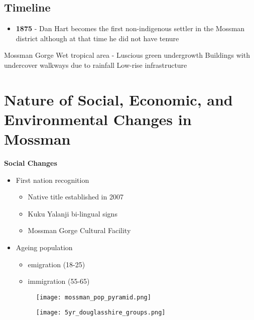 	\subsection{Timeline}
	
		\begin{itemize}
			\item \textbf{1875} - Dan Hart becomes the first non-indigenous settler in the Mossman district although at that time he did not have tenure
		\end{itemize}


	Mossman Gorge
	Wet tropical area - Luscious green undergrowth
	Buildings with undercover walkways due to rainfall
	Low-rise infrastructure


\section{Nature of Social, Economic, and Environmental Changes in Mossman} \label{18/03/2025}

	\textbf{Social Changes}

		\begin{itemize}
			\item First nation recognition
				\begin{itemize}
					\item Native title established in 2007
					\item Kuku Yalanji bi-lingual signs
					\item Mossman Gorge Cultural Facility
				\end{itemize}
			\item Ageing population
				\begin{itemize}
					\item emigration (18-25)
					\item immigration (55-65)
				\end{itemize}

			\begin{figure}[H]
				\centering
				\texttt{[image: mossman\_pop\_pyramid.png]}
			\end{figure}

			\begin{figure}[H]
				\texttt{[image: 5yr\_douglasshire\_groups.png]}
			\end{figure}
		\end{itemize}
	

